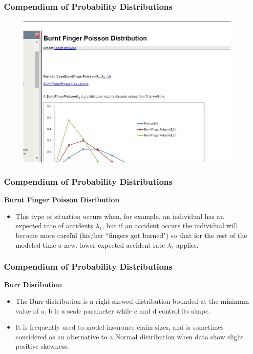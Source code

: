 \documentclass[MAIN.tex]{subfiles}
\begin{document}
\begin{frame}
	\frametitle{Compendium of Probability Distributions}
		\begin{figure}
\centering
\includegraphics[width=0.9\linewidth]{images/burntfinger}

\end{figure}

\end{frame}
\begin{frame}
	\frametitle{Compendium of Probability Distributions}
\textbf{Burnt Finger Poisson Disribution}
\begin{itemize}
\item This type of situation occurs when, for example, an individual has an expected rate of accidents $\lambda_1$, but if an accident occurs the individual will become more careful (his/her ``fingers got burned") so that for the rest of the modeled time a new, lower expected accident rate $\lambda_1$ applies.
\end{itemize}
\end{frame}
\begin{frame}
	\frametitle{Compendium of Probability Distributions}
	\textbf{Burr Disribution}
\begin{itemize}
\item The Burr distribution is a right-skewed distribution bounded at the minimum value of a. b is a scale parameter while c and d control its shape. 

\item It is frequently used to model insurance claim sizes, and is sometimes considered as an alternative to a Normal distribution when data show slight positive skewness.
\end{itemize}
\end{frame}
\end{document}
